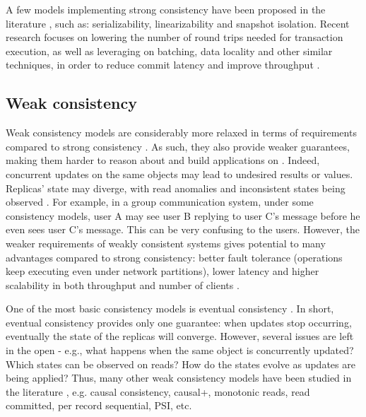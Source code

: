 A few models implementing strong consistency have been proposed in the literature \cite{linearizability,si}, such as: serializability, linearizability and snapshot isolation.
Recent research focuses on lowering the number of round trips needed for transaction execution, as well as leveraging on batching, data locality and other similar techniques, in order to reduce commit latency and improve throughput \cite{sconekv,caerus,detock,slog,tdsql}. %

\subsection{Weak consistency}
\label{subsec:weak}

Weak consistency models are considerably more relaxed in terms of requirements compared to strong consistency \cite{understandingEC}.
As such, they also provide weaker guarantees, making them harder to reason about and build applications on \cite{krikellas2010strongly,sconekv,slog,cops,cure,chainreaction,dynamo}.
Indeed, concurrent updates on the same objects may lead to undesired results or values.
Replicas' state may diverge, with read anomalies and inconsistent states being observed \cite{krikellas2010strongly,detock,slog,cops,cure,dynamo}.
For example, in a group communication system, under some consistency models, user A may see user B replying to user C's message before he even sees user C's message.
This can be very confusing to the users.
However, the weaker requirements of weakly consistent systems gives potential to many advantages compared to strong consistency: better fault tolerance (operations keep executing even under network partitions), lower latency and higher scalability in both throughput and number of clients \cite{slog,cops,cure,dynamo}.

One of the most basic consistency models is eventual consistency \cite{understandingEC}.
In short, eventual consistency provides only one guarantee: when updates stop occurring, eventually the state of the replicas will converge.
However, several issues are left in the open - e.g., what happens when the same object is concurrently updated? Which states can be observed on reads? How do the states evolve as updates are being applied?
Thus, many other weak consistency models have been studied in the literature \cite{understandingEC, session, cops, dynamo, cassandra, walter, pnuts}, e.g. causal consistency, causal+, monotonic reads, read committed, per record sequential, PSI, etc.

